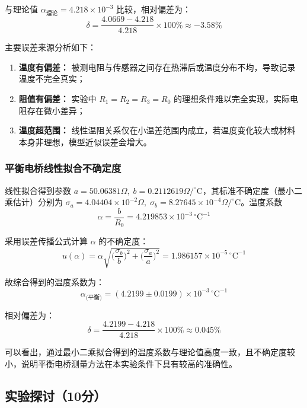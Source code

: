 \documentclass[]{../../templates/Report}%
\begin{document}
\begin{fullreportonly}
与理论值 $\alpha_{\text{理论}}=4.218\times10^{-3}$ 比较，相对偏差为：
\begin{equation}
\delta=\frac{4.0669-4.218}{4.218}\times100\%\approx -3.58\%
\end{equation}
\vspace{1mm}

主要误差来源分析如下：
\begin{enumerate}
    \item \textbf{温度有偏差：} 被测电阻与传感器之间存在热滞后或温度分布不均，导致记录温度不完全真实；
    \item \textbf{阻值有偏差：} 实验中 $R_1=R_2=R_3=R_0$ 的理想条件难以完全实现，实际电阻存在微小差异；
    \item \textbf{温度超范围：} 线性温阻关系仅在小温差范围内成立，若温度变化较大或材料本身非理想，模型近似误差会增大。
\end{enumerate}

\subsubsection{平衡电桥线性拟合不确定度}
线性拟合得到参数 $a=50.06381\Omega,\;b=0.2112619\Omega/^{\circ}\mathrm{C}$，其标准不确定度（最小二乘估计）分别为 $\sigma_a=4.04404\times10^{-2}\Omega,\;\sigma_b=8.27645\times10^{-4}\Omega/^{\circ}\mathrm{C}$。温度系数
\begin{equation}
\alpha=\frac{b}{R_0}=4.219853\times10^{-3}\,^{\circ}\mathrm{C}^{-1}
\end{equation}

采用误差传播公式计算 $\alpha$ 的不确定度：
\begin{equation}
u(\alpha)=\alpha\sqrt{\Big(\frac{\sigma_b}{b}\Big)^2+\Big(\frac{\sigma_a}{a}\Big)^2}=1.986157\times10^{-5}\,^{\circ}\mathrm{C}^{-1}
\end{equation}

故综合得到的温度系数为：
\begin{equation}
\boxed{\alpha_{\text{(平衡)}}=(4.2199\pm0.0199)\times10^{-3}\,^{\circ}\mathrm{C}^{-1}}
\end{equation}

相对偏差为：
\begin{equation}
\delta=\frac{4.2199-4.218}{4.218}\times100\%\approx 0.045\%
\end{equation}

可以看出，通过最小二乘拟合得到的温度系数与理论值高度一致，且不确定度较小，说明平衡电桥测量方法在本实验条件下具有较高的准确性。

\subsection{实验探讨（10分）}


\end{fullreportonly}
\end{document}
